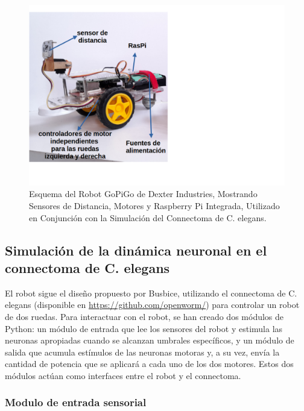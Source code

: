  \begin{figure}[h!]
	\centering\includegraphics[width=\imsize]{robot_gopigo.png}
	\caption[Esquema del Robot GoPiGo de Dexter Industries, Mostrando Sensores de Distancia, Motores y Raspberry Pi Integrada, Utilizado en Conjunción con la Simulación del Connectoma de C. elegans.  ]{ Esquema del Robot GoPiGo de Dexter Industries, Mostrando Sensores de Distancia, Motores y Raspberry Pi Integrada, Utilizado en Conjunción con la Simulación del Connectoma de C. elegans.}\label{fig:robot}
\end{figure}



\subsection{Simulación de la dinámica neuronal en el connectoma de C. elegans}\label{sec:dinamica}

El robot sigue el diseño propuesto por Busbice, utilizando el connectoma de C. elegans (disponible en \url{https://github.com/openworm/}) para controlar un robot de dos ruedas. Para interactuar con el robot, se han creado dos módulos de Python: un módulo de entrada que lee los sensores del robot y estimula las neuronas apropiadas cuando se alcanzan umbrales específicos, y un módulo de salida que acumula estímulos de las neuronas motoras y, a su vez, envía la cantidad de potencia que se aplicará a cada uno de los dos motores. Estos dos módulos actúan como interfaces entre el robot y el connectoma.


\subsubsection{Modulo de entrada sensorial}

